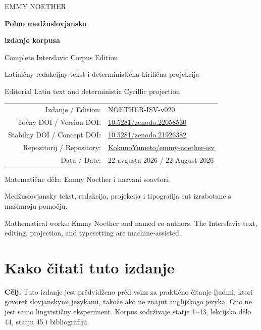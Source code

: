 \documentclass[11pt]{article}
\newcommand{\doiurl}[1]{\href{https://doi.org/#1}{#1}}
\newcommand{\repo}{\href{https://github.com/KokunoYumeto/emmy-noether-isv}{KokunoYumeto/emmy-noether-isv}}
\begin{document}
\thispagestyle{empty}
\begin{center}
\vspace*{1.2cm}
{\sffamily\color{NoetherBlue}\Large EMMY NOETHER\par}
\vspace{1.3cm}
{\sffamily\bfseries\Huge Polno medžuslovjansko\par}
{\sffamily\bfseries\Huge izdanje korpusa\par}
\vspace{0.55cm}
{\sffamily\Large Complete Interslavic Corpus Edition\par}
\vspace{1.2cm}
{\large Latiničny redakcijny tekst i deterministična kirilična projekcija\par}
{\large Editorial Latin text and deterministic Cyrillic projection\par}
\vfill
\begin{tabular}{@{}rl@{}}
Izdanje / Edition: & NOETHER-ISV-v020\\
Točny DOI / Version DOI: & \doiurl{10.5281/zenodo.22058530}\\
Stabilny DOI / Concept DOI: & \doiurl{10.5281/zenodo.21926382}\\
Repozitorij / Repository: & \repo\\
Data / Date: & 22 avgusta 2026 / 22 August 2026
\end{tabular}
\vfill
{\small Matematične děla: Emmy Noether i nazvani soavtori.\par}
{\small Medžuslovjansky tekst, redakcija, projekcija i tipografija sut izrabotane s mašinnoju pomočju.\par}
{\small Mathematical works: Emmy Noether and named co-authors. The Interslavic text, editing, projection, and typesetting are machine-assisted.\par}
\end{center}
\clearpage

\section*{Kako čitati tuto izdanje}

\textbf{Cělj.} Tuto izdanje jest prědvidženo prěd vsim za praktično čitanje ljudmi, ktori govoret slovjanskymi jezykami, takože ako ne znajut anglijskogo jezyka. Ono ne jest samo lingvističny eksperiment. Korpus sodrživaje statje 1--43, lekcijsko dělo 44, statju 45 i bibliografiju.
\end{document}
